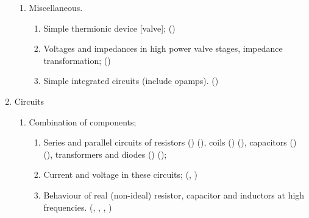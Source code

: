 \begin{flushleft}
\begin{enumerate}
\begin{enumerate}
\item Miscellaneous.
\begin{enumerate}
\item Simple thermionic device [valve];
  ()\label{HAREC.a.2.8.1}
\item Voltages and impedances in high power valve stages,
  impedance transformation; ()\label{HAREC.a.2.8.2}
\item Simple integrated circuits (include opamps).
  ()\label{HAREC.a.2.8.3}
\end{enumerate}
\end{enumerate}

\item Circuits
\begin{enumerate}

\item Combination of components;
\begin{enumerate}
\item Series and parallel circuits of resistors
  ()\label{HAREC.a.3.1.1a}
  ()\label{HAREC.a.3.1.1b},
  coils
  ()\label{HAREC.a.3.1.1c}
  ()\label{HAREC.a.3.1.1d},
  capacitors
  ()\label{HAREC.a.3.1.1e}
  ()\label{HAREC.a.3.1.1f},
  transformers and diodes
  ()\label{HAREC.a.3.1.1g}
  ()\label{HAREC.a.3.1.1h};
\item Current and voltage in these circuits;
  (, )\label{HAREC.a.3.1.2c}
\item Behaviour of real (non-ideal) resistor, capacitor and inductors at
  high frequencies.
  (, , ,
  )\label{HAREC.a.3.1.3e}
\end{enumerate}


\end{enumerate}
\end{enumerate}
\end{flushleft}
